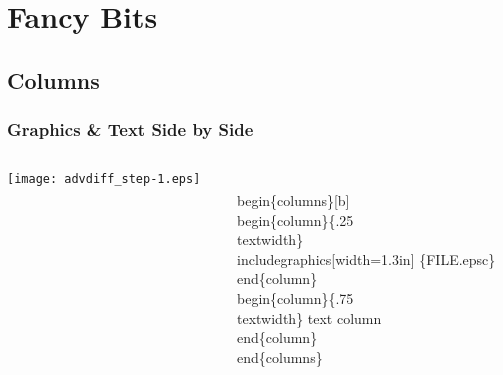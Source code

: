 \documentclass{beamer}
\begin{document}
\section{Fancy Bits}
\subsection{Columns}
\begin{frame}[fragile]
\frametitle{Graphics \& Text  Side by Side}
\begin{columns}[b]
  \begin{column}{.25\textwidth}
       \texttt{[image: advdiff\_step-1.eps]}
  \end{column}
    \begin{column}{.75\textwidth}
    \begin{semiverbatim}
 \alert<1>{\\begin\{columns\}[b]}
  \alert<2>{\\begin\{column\}\{.25\\textwidth\}}
        \alert<3>{\\includegraphics[width=1.3in]%
             \{FILE.epsc\}}
  \alert<2>{\\end\{column\}}
   \alert<4>{\\begin\{column\}\{.75\\textwidth\}}
        \alert<5>{text column}
   \alert<4>{\\end\{column\}}
 \alert<1>{\\end\{columns\}}
    \end{semiverbatim}
      \end{column}
\end{columns}
\end{frame} 

\end{document}
